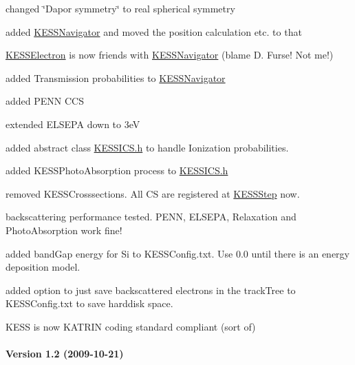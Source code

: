 \begin{DoxyItemize}
\item changed \char`\"{}Dapor symmetry\char`\"{} to real spherical symmetry
\item added \hyperlink{class_kassiopeia_1_1_k_e_s_s_navigator}{KESSNavigator} and moved the position calculation etc. to that
\item \hyperlink{class_kassiopeia_1_1_k_e_s_s_electron}{KESSElectron} is now friends with \hyperlink{class_kassiopeia_1_1_k_e_s_s_navigator}{KESSNavigator} (blame D. Furse! Not me!)
\item added Transmission probabilities to \hyperlink{class_kassiopeia_1_1_k_e_s_s_navigator}{KESSNavigator}
\item added PENN CCS
\item extended ELSEPA down to 3eV
\item added abstract class \hyperlink{_k_e_s_s_i_c_s_8h}{KESSICS.h} to handle Ionization probabilities.
\item added KESSPhotoAbsorption process to \hyperlink{_k_e_s_s_i_c_s_8h}{KESSICS.h}
\item removed KESSCrosssections. All CS are registered at \hyperlink{class_kassiopeia_1_1_k_e_s_s_step}{KESSStep} now.
\item backscattering performance tested. PENN, ELSEPA, Relaxation and PhotoAbsorption work fine!
\item added bandGap energy for Si to KESSConfig.txt. Use 0.0 until there is an energy deposition model.
\item added option to just save backscattered electrons in the trackTree to KESSConfig.txt to save harddisk space.
\item KESS is now KATRIN coding standard compliant (sort of)
\end{DoxyItemize}\hypertarget{_k_e_s_s_changelog_v12}{}\paragraph{Version 1.2 (2009-\/10-\/21)}\label{_k_e_s_s_changelog_v12}

